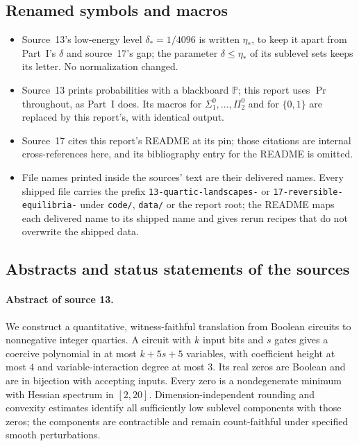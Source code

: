 \documentclass[11pt,letterpaper]{article}
\numberwithin{equation}{section}
\theoremstyle{definition}
\theoremstyle{remark}
\newcommand{\code}[1]{\nolinkurl{#1}}
\newcommand{\etastar}{\eta_*}
\begin{document}
\subsection{Renamed symbols and macros}
\begin{itemize}
\item Source~13's low-energy level $\delta_*=1/4096$ is written $\etastar$, to
keep it apart from Part~I's $\delta$ and source~17's gap; the parameter
$\delta\le\etastar$ of its sublevel sets keeps its letter. No normalization
changed.
\item Source~13 prints probabilities with a blackboard $\mathbb P$; this report
uses $\Pr$ throughout, as Part~I does. Its macros for $\Sigma^0_1,\ldots,
\Pi^0_2$ and for $\{0,1\}$ are replaced by this report's, with identical output.
\item Source~17 cites this report's README at its pin; those citations are
internal cross-references here, and its bibliography entry for the README is
omitted.
\item File names printed inside the sources' text are their delivered names.
Every shipped file carries the prefix \code{13-quartic-landscapes-} or
\code{17-reversible-equilibria-} under \code{code/}, \code{data/} or the
report root; the README maps each delivered name to its shipped name and gives
rerun recipes that do not overwrite the shipped data.
\end{itemize}

\subsection{Abstracts and status statements of the sources}
\label{pqc:conv:b62-V:status}
\paragraph{Abstract of source 13.}
\noindent We construct a quantitative, witness-faithful translation from Boolean
circuits to nonnegative integer quartics. A circuit with $k$ input bits and $s$
gates gives a coercive polynomial in at most $k+5s+5$ variables, with coefficient
height at most $4$ and variable-interaction degree at most $3$. Its real zeros
are Boolean and are in bijection with accepting inputs. Every zero is a
nondegenerate minimum with Hessian spectrum in $[2,20]$. Dimension-independent
rounding and convexity estimates identify all sufficiently low sublevel
components with those zeros; the components are contractible and remain
count-faithful under specified smooth perturbations.
\end{document}
